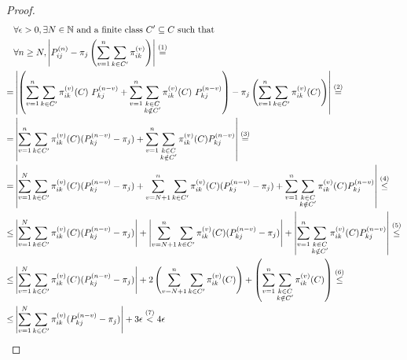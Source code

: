 \begin{proof}
		\begin{equation}\begin{split} \label{eq:theorem_3.1_first term}
			& \forall \epsilon > 0, \exists N \in \mathbb{N} \text{ and a finite class } C' \subseteq C \text{ such that } \\
			& \forall n \ge N, \left| P_{ij}^{(n)} - \pi_j \left( \sum_{v = 1}^{n} \sum_{k \in C'} \pi_{ik}^{(v)} \right) \right| \stackrel{(1)}{=}
			\\
			= & \left|
				\left(
					\sum_{v = 1}^{n} \sum_{k \in C'} \pi_{ik}^{(v)}(C) ~ P_{kj}^{(n-v)} + \sum_{v = 1}^{n} \sum_{\substack{k \in C \\ k \notin C'}} \pi_{ik}^{(v)}(C) ~ P_{kj}^{(n-v)} \right)
				- \pi_j \left( \sum_{v = 1}^{n} \sum_{k \in C'} \pi_{ik}^{(v)}(C) \right)
				\right| \stackrel{(2)}{=}
			\\
			= & \left| \sum_{v = 1}^{n} \sum_{k \in C'} \pi_{ik}^{(v)}(C) (P_{kj}^{(n-v)} - \pi_j)
				+ \sum_{v = 1}^{n} \sum_{\substack{k \in C \\ k \notin C'}} \pi_{ik}^{(v)}(C) P_{kj}^{(n-v)} \right| \stackrel{(3)}{=}
			\\
			= & \left| \sum_{v = 1}^{N} \sum_{k \in C'} \pi_{ik}^{(v)}(C) (P_{kj}^{(n-v)} - \pi_j) +
				\sum_{v = N+1}^{n} \sum_{k \in C'} \pi_{ik}^{(v)}(C) (P_{kj}^{(n-v)} - \pi_j) +
				\sum_{v = 1}^{n} \sum_{\substack{k \in C \\ k \notin C'}} \pi_{ik}^{(v)}(C) P_{kj}^{(n-v)} \right| \stackrel{(4)}{\le}
			\\
			\le & \left| \sum_{v = 1}^{N} \sum_{k \in C'} \pi_{ik}^{(v)}(C) (P_{kj}^{(n-v)} - \pi_j) \right| +
				\left| \sum_{v = N+1}^{n} \sum_{k \in C'} \pi_{ik}^{(v)}(C) (P_{kj}^{(n-v)} - \pi_j) \right| +
				\left| \sum_{v = 1}^{n} \sum_{\substack{k \in C \\ k \notin C'}} \pi_{ik}^{(v)}(C) P_{kj}^{(n-v)} \right| \stackrel{(5)}{\le}
			\\
			\le & \left| \sum_{v = 1}^{N} \sum_{k \in C'} \pi_{ik}^{(v)}(C) (P_{kj}^{(n-v)} - \pi_j) \right| +
				2 \left( \sum_{v = N+1}^{n} \sum_{k \in C'} \pi_{ik}^{(v)}(C) \right) +
				\left( \sum_{v = 1}^{n} \sum_{\substack{k \in C \\ k \notin C'}} \pi_{ik}^{(v)}(C) \right) \stackrel{(6)}{\le}
			\\
			\le & \left| \sum_{v = 1}^{N} \sum_{k \in C'} \pi_{ik}^{(v)} (P_{kj}^{(n-v)} - \pi_j) \right| + 3 \epsilon \stackrel{(7)}{<} 4 \epsilon
		\end{split}\end{equation}


\end{proof}
